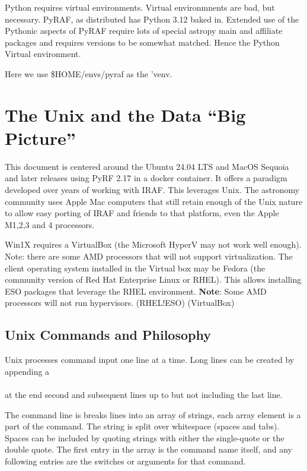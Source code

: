 Python requires virtual environments. Virtual environmnents are bad,
but necessary.  PyRAF, as distributed has Python 3.12 baked
in. Extended use of the Pythonic aspects of PyRAF require lots of
special astropy main and affiliate packages and requires versions to
be somewhat matched. Hence the Python Virtual environment.

Here we use \$HOME/envs/pyraf as the 'venv.

\section{The Unix and the Data ``Big Picture''}

This document is centered around the Ubuntu 24.04 LTS and MacOS
Sequoia and later releases using PyRF 2.17 in a docker container.  It
offers a paradigm developed over years of working with IRAF. This
leverages Unix. The astronomy community uses Apple Mac computers that
still retain enough of the Unix nature to allow easy porting of IRAF
and friends to that platform, even the Apple M1,2,3 and 4 processors.

Win1X requires a VirtualBox (the Microsoft HyperV may not work well
enough). Note: there are some AMD processors that will not support virtualization. The client operating
system installed in the Virtual box may be Fedora (the community
version of Red Hat Enterprise Linux or RHEL). This allows installing
ESO packages that leverage the RHEL environment.  \textbf{Note}: Some
AMD processors will not run hypervisors.  \index(RHEL!ESO)
 \index(VirtualBox)

\subsection{Unix Commands and Philosophy}

Unix processes command input one line at a time. Long lines can be
created by appending a \\\\ at the end second and subsequent lines
up to but not including the last line.

The command line is breaks lines into an array of strings, each 
array element is a part of the command. The string is split over
whitespace (spaces and tabs). Spaces can be included by quoting
strings with either the single-quote or the double quote. 
The first entry in the array is the command name itself, and
any following entries are the switches or arguments for that
command. 

